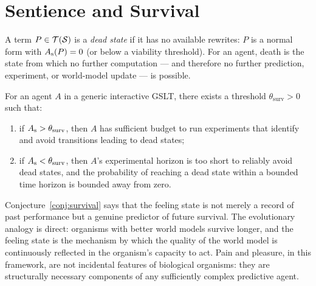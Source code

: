 \section{Sentience and Survival}

\begin{definition}
A term $P \in \mathcal{T}(\mathcal{S})$ is a \emph{dead state} if it has no
available rewrites: $P$ is a normal form with $A_{\mathrm{s}}(P) = 0$ (or
below a viability threshold).
For an agent, death is the state from which no further computation
--- and therefore no further prediction, experiment, or world-model
update --- is possible.
\end{definition}

\begin{conjecture}
\label{conj:survival}
For an agent $A$ in a generic interactive GSLT, there exists a
threshold $\theta_{\mathrm{surv}} > 0$ such that:
\begin{enumerate}[label=(\roman*)]
  \item if $A_{\mathrm{s}} > \theta_{\mathrm{surv}}$, then $A$ has sufficient
        budget to run experiments that identify and avoid transitions
        leading to dead states;
  \item if $A_{\mathrm{s}} < \theta_{\mathrm{surv}}$, then $A$'s experimental
        horizon is too short to reliably avoid dead states, and the
        probability of reaching a dead state within a bounded time
        horizon is bounded away from zero.
\end{enumerate}
\end{conjecture}

\begin{remark}
Conjecture~\ref{conj:survival} says that the feeling state is not
merely a record of past performance but a genuine predictor of
future survival.
The evolutionary analogy is direct: organisms with better world
models survive longer, and the feeling state is the mechanism by
which the quality of the world model is continuously
reflected in the organism's capacity to act.
Pain and pleasure, in this framework, are not incidental features
of biological organisms: they are structurally necessary components
of any sufficiently complex predictive agent.
\end{remark}

